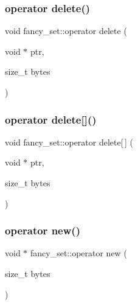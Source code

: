 \subsubsection{\texorpdfstring{operator delete()}{operator delete()}}
{\footnotesize\ttfamily void fancy\+\_\+set\+::operator delete (\begin{DoxyParamCaption}\item[{void $\ast$}]{ptr,  }\item[{size\+\_\+t}]{bytes }\end{DoxyParamCaption})}

\mbox{\label{classfancy__set_a55de66bbfd245c462b2d34625c809ac2}} 
\subsubsection{\texorpdfstring{operator delete[]()}{operator delete[]()}}
{\footnotesize\ttfamily void fancy\+\_\+set\+::operator delete\mbox{[}$\,$\mbox{]} (\begin{DoxyParamCaption}\item[{void $\ast$}]{ptr,  }\item[{size\+\_\+t}]{bytes }\end{DoxyParamCaption})}

\mbox{\label{classfancy__set_aa3cd291c07ee0c2bf132bae673915949}} 
\subsubsection{\texorpdfstring{operator new()}{operator new()}}
{\footnotesize\ttfamily void $\ast$ fancy\+\_\+set\+::operator new (\begin{DoxyParamCaption}\item[{size\+\_\+t}]{bytes }\end{DoxyParamCaption})}

\mbox{\label{classfancy__set_a0544eccb3c739e24da2e6f5c57720b6b}} 
